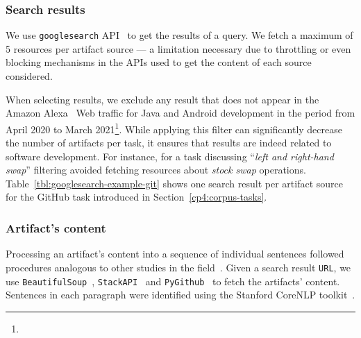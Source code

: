\subsubsection{Search results}


We use \texttt{googlesearch} API~\cite{googlesearch} to get the results of a query. 
We fetch a maximum of 5 resources per artifact source --- a limitation necessary due to throttling or even blocking mechanisms in the APIs used to get the content of each source considered.


When selecting results, we exclude any result that does not appear in the Amazon Alexa~\cite{alexa} Web traffic for Java and Android development in the period from April 2020 to March 2021\footnote{}. 
While applying this filter can significantly decrease the number of artifacts per task, it ensures that results are indeed related to software development. 
For instance, for a task discussing ``\textit{left and right-hand swap}'' 
filtering avoided fetching resources about  \textit{stock swap} operations.
Table~\ref{tbl:googlesearch-example-git} shows one search result per artifact source for the GitHub task introduced in Section~\ref{cp4:corpus-tasks}.




\subsubsection{Artifact's content}


Processing an artifact's content into a sequence of individual sentences 
followed procedures analogous to other studies in the field~\cite{Arya2019, nadi2020}.
Given a search result \texttt{URL}, we use \texttt{BeautifulSoup}~\cite{beautifulsoup4},
\texttt{StackAPI}~\cite{StackAPI} and \texttt{PyGithub}~\cite{PyGithub}
to fetch the artifacts' content. Sentences in each paragraph
were identified using the Stanford CoreNLP toolkit~\cite{CoreNLP}.








